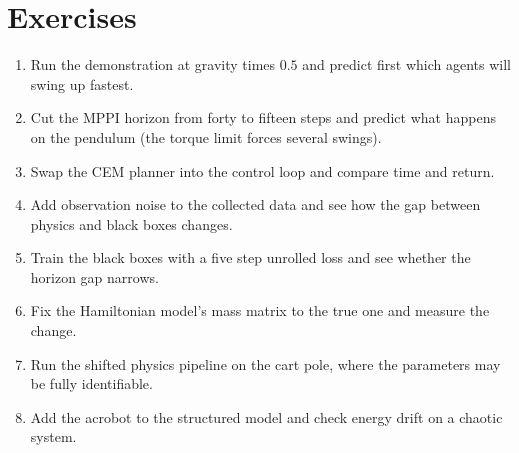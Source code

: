 \documentclass[11pt,a4paper]{article}
\begin{document}
\section{Exercises}
\begin{enumerate}[leftmargin=1.8em]
\item Run the demonstration at gravity times $0.5$ and predict first which agents will swing up fastest.
\item Cut the MPPI horizon from forty to fifteen steps and predict what happens on the pendulum (the torque limit forces several swings).
\item Swap the CEM planner into the control loop and compare time and return.
\item Add observation noise to the collected data and see how the gap between physics and black boxes changes.
\item Train the black boxes with a five step unrolled loss and see whether the horizon gap narrows.
\item Fix the Hamiltonian model's mass matrix to the true one and measure the change.
\item Run the shifted physics pipeline on the cart pole, where the parameters may be fully identifiable.
\item Add the acrobot to the structured model and check energy drift on a chaotic system.
\end{enumerate}
\end{document}
